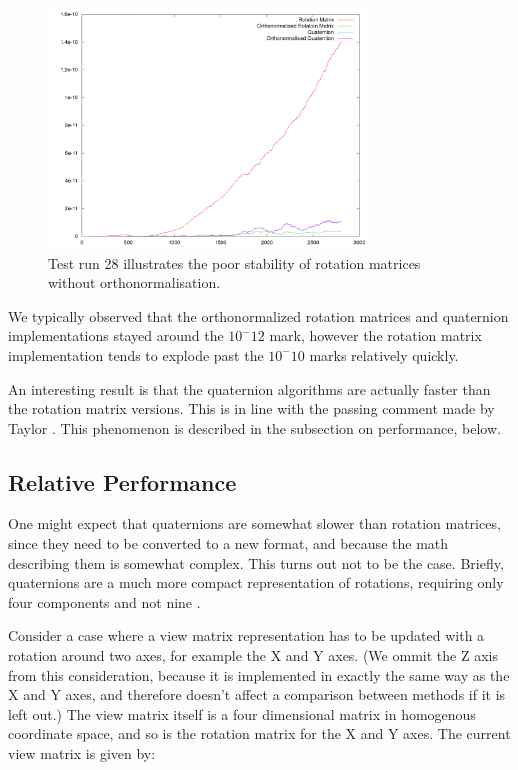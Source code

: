 \documentclass{acm_proc_article-sp}
\begin{document}
\begin{figure}
\includegraphics[width=8.5cm]{plots/stability_plot_28.png}
\caption{Test run 28 illustrates the poor stability of rotation matrices without orthonormalisation.}
\end{figure}

We typically observed that the orthonormalized rotation matrices and quaternion implementations stayed around the $10^-12$ mark, however the rotation matrix implementation tends to explode past the $10^-10$ marks relatively quickly.

An interesting result is that the quaternion algorithms are actually faster than the rotation matrix versions.
This is in line with the passing comment made by Taylor \parencite[435]{taylor79}.
This phenomenon is described in the subsection on performance, below.

\subsection{Relative Performance}

One might expect that quaternions are somewhat slower than rotation matrices, since they need to be converted to a new format, and because the math describing them is somewhat complex.
This turns out not to be the case.
Briefly, quaternions are a much more compact representation of rotations, requiring only four components and not nine \parencite[435]{taylor79}.

Consider a case where a view matrix representation has to be updated with a rotation around two axes, for example the X and Y axes.
(We ommit the Z axis from this consideration, because it is implemented in exactly the same way as the X and Y axes, and therefore doesn't affect a comparison between methods if it is left out.)
The view matrix itself is a four dimensional matrix in homogenous coordinate space, and so is the rotation matrix for the X and Y axes.
The current view matrix is given by:
\end{document}
